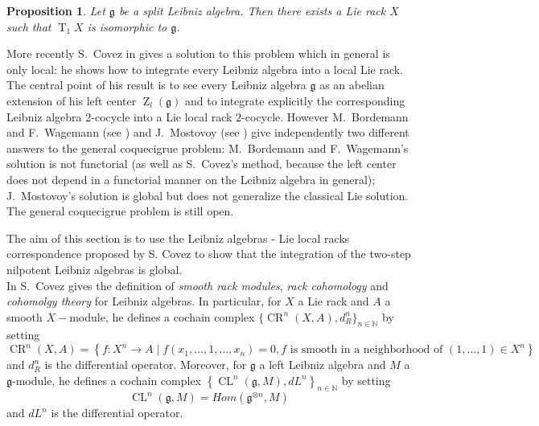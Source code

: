 \documentclass[english,4paper,10pt]{article}
\newcommand{\mg}{\mathfrak{g}}
\newtheorem{prop}[thm]{Proposition}
\begin{document}
\begin{prop}{\cite{kinyon2004leibniz}}
	Let $\mg$ be a split Leibniz algebra. Then there exists a Lie rack $X$ such that $\operatorname{T}_1X$ is isomorphic to $\mg$.
\end{prop}

More recently S.\ Covez in \cite{covez2013local} gives a solution to this problem which in general is only local: he shows how to integrate every Leibniz algebra into a local Lie rack. The central point of his result is to see every Leibniz algebra $\mg$ as an abelian extension of his left center $\operatorname{Z}_l(\mg)$ and to integrate explicitly the corresponding Leibniz algebra $2$-cocycle into a Lie local rack $2$-cocycle. However M.\ Bordemann and F.\ Wagemann (see \cite{integrBordemann}) and J.\ Mostovoy (see \cite{acommentMostovoy}) give independently two different answers to the general coquecigrue problem: M.\ Bordemann and F.\ Wagemann's solution is not functorial (as well as S.\ Covez's method, because the left center does not depend in a functorial manner on the Leibniz algebra in general); J.\ Mostovoy's solution is global but does not generalize the classical Lie solution. The general coquecigrue problem is still open.

The aim of this section is to use the Leibniz algebras - Lie local racks correspondence proposed by S. Covez to show that the integration of the two-step nilpotent Leibniz algebras is global. \\

In \cite{covez2013local} S.\ Covez gives the definition of \textit{smooth rack modules}, \textit{rack cohomology} and \textit{cohomolgy theory} for Leibniz algebras. In particular, for $X$ a Lie rack and $A$ a smooth $X-$module, he defines a cochain complex $\lbrace \operatorname{CR}^n\left(X,A\right), d^n_R\rbrace_{n\in\mathbb{N}}$  by setting
$$
\operatorname{CR}^n\left(X,A\right)=\left\{f:X^n\rightarrow A\;\vert\; f(x_1,\ldots,1,\ldots,x_n)=0, \text{$f$ is smooth in a neighborhood of }\left(1,\ldots,1\right)\in X^n\right\}
$$
and $d^n_R$ is the differential operator. Moreover, for $\mg$ a left Leibniz algebra and $M$ a $\mg$-module, he defines a cochain complex $\left\{\operatorname{CL}^n(\mg,M),dL^n\right\}_{n\in\mathbb{N}}$ by setting
$$
\operatorname{CL}^n(\mg,M)=Hom(\mg^{\otimes n},M)
$$
and $dL^n$ is the differential operator.\\
\end{document}
